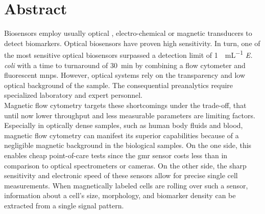 \chapter{Abstract}
Biosensors employ usually optical \cite{lit:bio:BioconjugateTechniques}, electro-chemical \cite{lit:fluidic:BindingPhysicsSurfaces} or magnetic \cite{lit:thes:reisbeck, lit:bio:MRCyte2016, lit:bio:NanoCytometer} transducers to detect biomarkers.  Optical  biosensors  have  proven high sensitivity.\cite{lit:Shapiro}  In turn, one of the  most  sensitive  optical  biosensors surpassed a detection limit of \SI{1}{\cfu\per\milli\liter} \textit{E. coli} with a time to turnaround of \SI{30}{\minute} by combining a flow  cytometer and fluorescent \glspl{mnp}.\cite{lit:flowCytometer} However, optical systems rely on the transparency and low optical background of the sample. The consequential preanalytics require specialized laboratory and expert personnel.\\
Magnetic flow cytometry targets these shortcomings under the trade-off, that until now lower throughput and less measurable parameters are limiting factors.\cite{lit:thes:reisbeck} Especially in optically dense samples, such as human body fluids and blood, magnetic flow cytometry can manifest its superior capabilities because of a negligible magnetic background in the biological samples.\cite{lit:bio:biochip:cd64} On the one side, this enables cheap point-of-care tests since the \gls{gmr} sensor costs less than  in comparison to optical spectrometers or cameras.\cite{lit:fluidic:HighFlowGMR,lit:bio:aflatoxinMNP,lit:bio:POC_CD64} On the other side, the sharp sensitivity and electronic speed of these sensors allow for precise single cell measurements.\cite{lit:bio:MRCyte2016,lit:fluidic:GMR_Quantification, lit:paperHelou} When magnetically labeled cells are rolling over such a sensor, information about a cell's size, morphology, and biomarker density can be extracted from a single signal pattern.\cite{lit:thes:michaelBauer} 

